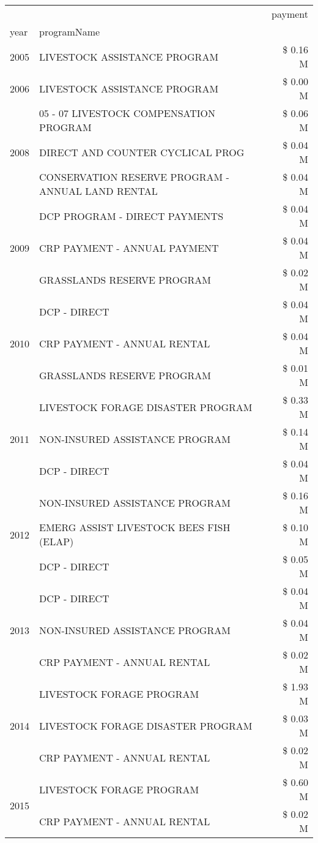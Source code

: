 \begin{tabular}{llr}
\toprule
 &  & payment \\
year & programName &  \\
\midrule
2005 & LIVESTOCK ASSISTANCE PROGRAM & \$ 0.16 M \\
\cline{1-3}
2006 & LIVESTOCK ASSISTANCE PROGRAM & \$ 0.00 M \\
\cline{1-3}
\multirow[t]{3}{*}{2008} & 05 - 07 LIVESTOCK COMPENSATION PROGRAM & \$ 0.06 M \\
 & DIRECT AND COUNTER CYCLICAL PROG & \$ 0.04 M \\
 & CONSERVATION RESERVE PROGRAM - ANNUAL LAND RENTAL & \$ 0.04 M \\
\cline{1-3}
\multirow[t]{3}{*}{2009} & DCP PROGRAM - DIRECT PAYMENTS & \$ 0.04 M \\
 & CRP PAYMENT - ANNUAL PAYMENT & \$ 0.04 M \\
 & GRASSLANDS RESERVE PROGRAM & \$ 0.02 M \\
\cline{1-3}
\multirow[t]{3}{*}{2010} & DCP - DIRECT & \$ 0.04 M \\
 & CRP PAYMENT - ANNUAL RENTAL & \$ 0.04 M \\
 & GRASSLANDS RESERVE PROGRAM & \$ 0.01 M \\
\cline{1-3}
\multirow[t]{3}{*}{2011} & LIVESTOCK FORAGE DISASTER PROGRAM & \$ 0.33 M \\
 & NON-INSURED ASSISTANCE PROGRAM & \$ 0.14 M \\
 & DCP - DIRECT & \$ 0.04 M \\
\cline{1-3}
\multirow[t]{3}{*}{2012} & NON-INSURED ASSISTANCE PROGRAM & \$ 0.16 M \\
 & EMERG ASSIST LIVESTOCK BEES FISH (ELAP) & \$ 0.10 M \\
 & DCP - DIRECT & \$ 0.05 M \\
\cline{1-3}
\multirow[t]{3}{*}{2013} & DCP - DIRECT & \$ 0.04 M \\
 & NON-INSURED ASSISTANCE PROGRAM & \$ 0.04 M \\
 & CRP PAYMENT - ANNUAL RENTAL & \$ 0.02 M \\
\cline{1-3}
\multirow[t]{3}{*}{2014} & LIVESTOCK FORAGE PROGRAM & \$ 1.93 M \\
 & LIVESTOCK FORAGE DISASTER PROGRAM & \$ 0.03 M \\
 & CRP PAYMENT - ANNUAL RENTAL & \$ 0.02 M \\
\cline{1-3}
\multirow[t]{3}{*}{2015} & LIVESTOCK FORAGE PROGRAM & \$ 0.60 M \\
 & CRP PAYMENT - ANNUAL RENTAL & \$ 0.02 M \\

\end{tabular}
